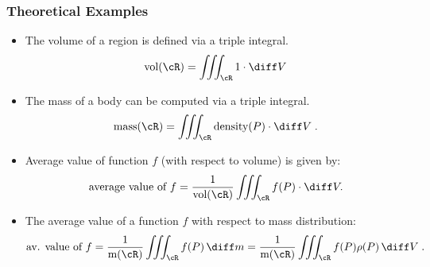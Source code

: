 \begin{frame}
\frametitle{Theoretical Examples}
\begin{itemize}
\item The volume of a region is defined via a triple integral.
\[
\text{vol}(\cR) = \iiint_{\cR} 1 \cdot \diff V
\]
\item<2-> The mass of a body can be computed via a triple integral.
\[
\text{mass}(\cR) = \iiint_{\cR} \text{density}(P) \cdot \diff V\; .
\]
\item<3-> Average value of function $f$ (with respect to volume) is given by:
\[
\text{average value of }f = \frac{1}{\text{vol}(\cR)} \iiint_{\cR} f(P) \cdot \diff V .
\]
\item<4-> The average value of a function $f$ with respect to mass distribution:
\[
\text{av. value of }f = \frac{1}{\text{m}(\cR)} \iiint_{\cR} f(P)\,  \diff m = \frac{1}{\text{m}(\cR)} \iiint_{\cR} f(P)\rho(P)\, \diff V\; .
\]
\end{itemize}

\end{frame}